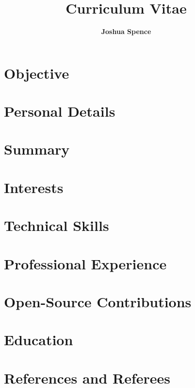 \documentclass{article}
\title{\Huge{\textbf{Curriculum Vitae}}}
\author{\Large{\textbf{Joshua Spence}}}
\date{}
\newcommand{\cvsection}[2]{%
  \section*{#1}%
}
\begin{document}
\maketitle

\cvsection{Objective}{objective}
\cvsection{Personal Details}{personal}
\cvsection{Summary}{summary}
\cvsection{Interests}{interests}
\newpage
\cvsection{Technical Skills}{skills}
\cvsection{Professional Experience}{experience}
\cvsection{Open-Source Contributions}{oss}
\cvsection{Education}{education}
\cvsection{References and Referees}{references}
\end{document}
